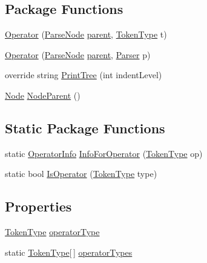 \subsection*{Package Functions}
\begin{DoxyCompactItemize}
\item 
\hyperlink{a00058_a91a9fcc02c55cbc107fe2687fc0f05d4}{Operator} (\hyperlink{a00063}{Parse\-Node} \hyperlink{a00063_af313a82103fcc2ff5a177dbb06b92f7b}{parent}, \hyperlink{a00026_a301aa7c866593a5b625a8fc158bbeace}{Token\-Type} t)
\item 
\hyperlink{a00058_a50f9f95cd7aefe2a601a7d5b5ee7801a}{Operator} (\hyperlink{a00063}{Parse\-Node} \hyperlink{a00063_af313a82103fcc2ff5a177dbb06b92f7b}{parent}, \hyperlink{a00064}{Parser} p)
\item 
override string \hyperlink{a00058_a0c2ad7c4d6837ffc7b5325bbb8330c51}{Print\-Tree} (int indent\-Level)
\item 
\hyperlink{a00054}{Node} \hyperlink{a00063_a580e520a29444fc23ac3660cbe514a09}{Node\-Parent} ()
\end{DoxyCompactItemize}
\subsection*{Static Package Functions}
\begin{DoxyCompactItemize}
\item 
static \hyperlink{a00059}{Operator\-Info} \hyperlink{a00058_a871e7b4652c48f456647d3950ac37531}{Info\-For\-Operator} (\hyperlink{a00026_a301aa7c866593a5b625a8fc158bbeace}{Token\-Type} op)
\item 
static bool \hyperlink{a00058_a77a9edf71f86263e1695869e69505007}{Is\-Operator} (\hyperlink{a00026_a301aa7c866593a5b625a8fc158bbeace}{Token\-Type} type)
\end{DoxyCompactItemize}
\subsection*{Properties}
\begin{DoxyCompactItemize}
\item 
\hyperlink{a00026_a301aa7c866593a5b625a8fc158bbeace}{Token\-Type} \hyperlink{a00058_ac2de2f59be0e69b316627a4de16fadd3}{operator\-Type}
\item 
static \hyperlink{a00026_a301aa7c866593a5b625a8fc158bbeace}{Token\-Type}\mbox{[}$\,$\mbox{]} \hyperlink{a00058_a8dca7db3b76b8c358aba6068274e07df}{operator\-Types}
\end{DoxyCompactItemize}


